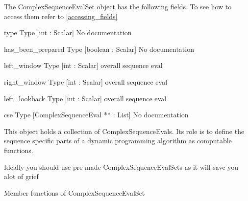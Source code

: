 \label{object_ComplexSequenceEvalSet}

The ComplexSequenceEvalSet object has the following fields. To see how to access them refer to \ref{accessing_fields}
\begin{description}
\item{type} Type [int : Scalar] No documentation

\item{has_been_prepared} Type [boolean : Scalar] No documentation

\item{left_window} Type [int : Scalar]  overall sequence eval 

\item{right_window} Type [int : Scalar]  overall sequence eval

\item{left_lookback} Type [int : Scalar]  overall sequence eval

\item{cse} Type [ComplexSequenceEval ** : List] No documentation

\end{description}
This object holds a collection of 
ComplexSequenceEvals. Its role is to
define the sequence specific parts of a
dynamic programming algorithm as computable
functions. 


Ideally you should use pre-made ComplexSequenceEvalSets
as it will save you alot of grief




Member functions of ComplexSequenceEvalSet


